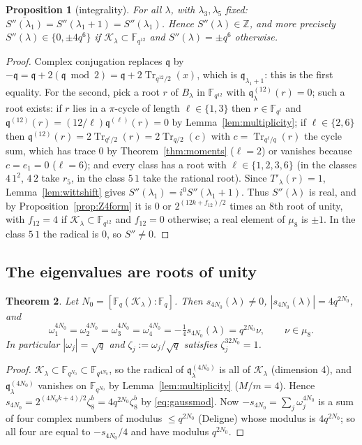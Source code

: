 \documentclass[12pt,a4paper]{amsart}
\newtheorem{theorem}{Theorem}[section]
\newtheorem{proposition}[theorem]{Proposition}
\theoremstyle{definition}
\newcommand{\F}{\mathbb{F}}
\newcommand{\Z}{\mathbb{Z}}
\newcommand{\Tr}{\operatorname{Tr}}
\newcommand{\Kk}{\mathcal{K}}
\newcommand{\qq}{\mathfrak{q}}
\newcommand{\Spp}{S''}
\begin{document}
\begin{proposition}[integrality]\label{prop:real}
For all $\lambda$, with $\lambda_3,\lambda_5$ fixed: $\overline{\Spp(\lambda_1)}=\Spp(\lambda_1+1)=\Spp(\lambda_1)$. Hence $\Spp(\lambda)\in\Z$, and more precisely $\Spp(\lambda)\in\{0,\pm4q^6\}$ if $\Kk_\lambda\subset\F_{q^{12}}$ and $\Spp(\lambda)=\pm q^6$ otherwise.
\end{proposition}
\begin{proof}
Complex conjugation replaces $\qq$ by $-\qq=\qq+2(\qq\bmod2)=\qq+2\Tr_{q^{12}/2}(x)$, which is $\qq_{\lambda_1+1}$: this is the first equality. For the second, pick a root $r$ of $B_\lambda$ in $\F_{q^{12}}$ with $\qq^{(12)}_\lambda(r)=0$; such a root exists: if $r$ lies in a $\pi$-cycle of length $\ell\in\{1,3\}$ then $r\in\F_{q^\ell}$ and $\qq^{(12)}(r)=(12/\ell)\qq^{(\ell)}(r)=0$ by Lemma~\ref{lem:multiplicity}; if $\ell\in\{2,6\}$ then $\qq^{(12)}(r)=2\Tr_{q^\ell/2}(r)=2\Tr_{q/2}(c)$ with $c=\Tr_{q^\ell/q}(r)$ the cycle sum, which has trace $0$ by Theorem~\ref{thm:moments} ($\ell=2$) or vanishes because $c=e_1=0$ ($\ell=6$); and every class has a root with $\ell\in\{1,2,3,6\}$ (in the classes $4\,1^2$, $4\,2$ take $r_5$, in the class $5\,1$ take the rational root). Since $T'_\lambda(r)=1$, Lemma~\ref{lem:wittshift} gives $\Spp(\lambda_1)=i^{0}\Spp(\lambda_1+1)$. Thus $\Spp(\lambda)$ is real, and by Proposition~\ref{prop:Z4form} it is $0$ or $2^{(12k+f_{12})/2}$ times an $8$th root of unity, with $f_{12}=4$ if $\Kk_\lambda\subset\F_{q^{12}}$ and $f_{12}=0$ otherwise; a real element of $\mu_8$ is $\pm1$. In the class $5\,1$ the radical is $0$, so $\Spp\ne0$.
\end{proof}

\subsection{The eigenvalues are roots of unity}
\begin{theorem}\label{thm:rootsofunity}
Let $N_0=[\F_q(\Kk_\lambda):\F_q]$. Then $s_{4N_0}(\lambda)\ne0$, $|s_{4N_0}(\lambda)|=4q^{2N_0}$, and
\[
\omega_1^{4N_0}=\omega_2^{4N_0}=\omega_3^{4N_0}=\omega_4^{4N_0}=-\tfrac14s_{4N_0}(\lambda)=q^{2N_0}\nu,\qquad \nu\in\mu_8 .
\]
In particular $|\omega_j|=\sqrt q$ and $\zeta_j:=\omega_j/\sqrt q$ satisfies $\zeta_j^{32N_0}=1$.
\end{theorem}
\begin{proof}
$\Kk_\lambda\subset\F_{q^{N_0}}\subset\F_{q^{4N_0}}$, so the radical of $\qq^{(4N_0)}_\lambda$ is all of $\Kk_\lambda$ (dimension $4$), and $\qq^{(4N_0)}_\lambda$ vanishes on $\F_{q^{N_0}}$ by Lemma~\ref{lem:multiplicity} ($M/m=4$). Hence $s_{4N_0}=2^{(4N_0k+4)/2}\zeta_8^b=4q^{2N_0}\zeta_8^b$ by \eqref{eq:gaussmod}. Now $-s_{4N_0}=\sum_j\omega_j^{4N_0}$ is a sum of four complex numbers of modulus $\le q^{2N_0}$ (Deligne) whose modulus is $4q^{2N_0}$; so all four are equal to $-s_{4N_0}/4$ and have modulus $q^{2N_0}$.
\end{proof}
\end{document}
